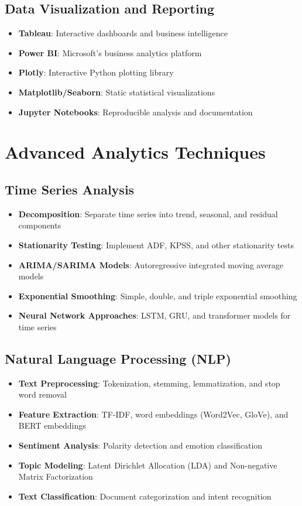 \documentclass[11pt,a4paper]{article}
\begin{document}
\subsection{Data Visualization and Reporting}
\begin{itemize}[leftmargin=*]
    \item \textbf{Tableau}: Interactive dashboards and business intelligence
    \item \textbf{Power BI}: Microsoft's business analytics platform
    \item \textbf{Plotly}: Interactive Python plotting library
    \item \textbf{Matplotlib/Seaborn}: Static statistical visualizations
    \item \textbf{Jupyter Notebooks}: Reproducible analysis and documentation
\end{itemize}

\section{Advanced Analytics Techniques}

\subsection{Time Series Analysis}
\begin{itemize}[leftmargin=*]
    \item \textbf{Decomposition}: Separate time series into trend, seasonal, and residual components
    \item \textbf{Stationarity Testing}: Implement ADF, KPSS, and other stationarity tests
    \item \textbf{ARIMA/SARIMA Models}: Autoregressive integrated moving average models
    \item \textbf{Exponential Smoothing}: Simple, double, and triple exponential smoothing
    \item \textbf{Neural Network Approaches}: LSTM, GRU, and transformer models for time series
\end{itemize}

\subsection{Natural Language Processing (NLP)}
\begin{itemize}[leftmargin=*]
    \item \textbf{Text Preprocessing}: Tokenization, stemming, lemmatization, and stop word removal
    \item \textbf{Feature Extraction}: TF-IDF, word embeddings (Word2Vec, GloVe), and BERT embeddings
    \item \textbf{Sentiment Analysis}: Polarity detection and emotion classification
    \item \textbf{Topic Modeling}: Latent Dirichlet Allocation (LDA) and Non-negative Matrix Factorization
    \item \textbf{Text Classification}: Document categorization and intent recognition
\end{itemize}
\end{document}
